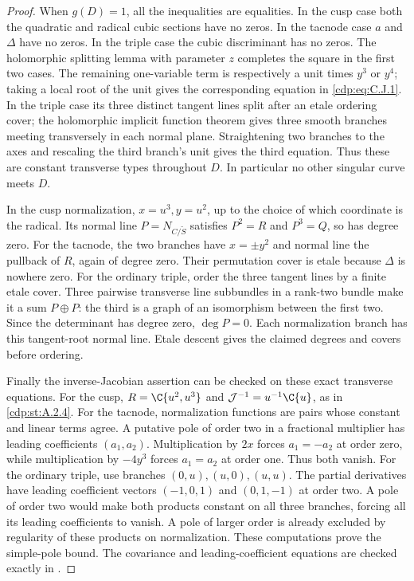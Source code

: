 \begin{proof}
When $g(D)=1$, all the inequalities are equalities. In the cusp case both the quadratic and radical cubic sections have no zeros. In the tacnode case $a$ and $\Delta$ have no zeros. In the triple case the cubic discriminant has no zeros. The holomorphic splitting lemma with parameter $z$ completes the square in the first two cases. The remaining one-variable term is respectively a unit times $y^3$ or $y^4$; taking a local root of the unit gives the corresponding equation in \eqref{cdp:eq:C.J.1}. In the triple case its three distinct tangent lines split after an etale ordering cover; the holomorphic implicit function theorem gives three smooth branches meeting transversely in each normal plane. Straightening two branches to the axes and rescaling the third branch's unit gives the third equation. Thus these are constant transverse types throughout $D$. In particular no other singular curve meets $D$.

In the cusp normalization, $x=u^3,y=u^2$, up to the choice of which coordinate is the radical. Its normal line $P=N_{C/\widetilde S}$ satisfies $P^2=R$ and $P^3=Q$, so has degree zero. For the tacnode, the two branches have $x=\pm y^2$ and normal line the pullback of $R$, again of degree zero. Their permutation cover is etale because $\Delta$ is nowhere zero. For the ordinary triple, order the three tangent lines by a finite etale cover. Three pairwise transverse line subbundles in a rank-two bundle make it a sum $P\oplus P$: the third is a graph of an isomorphism between the first two. Since the determinant has degree zero, $\deg P=0$. Each normalization branch has this tangent-root normal line. Etale descent gives the claimed degrees and covers before ordering.

Finally the inverse-Jacobian assertion can be checked on these exact transverse equations. For the cusp, $R=\C\{u^2,u^3\}$ and $\mathcal J^{-1}=u^{-1}\C\{u\}$, as in \ref{cdp:st:A.2.4}. For the tacnode, normalization functions are pairs whose constant and linear terms agree. A putative pole of order two in a fractional multiplier has leading coefficients $(a_1,a_2)$. Multiplication by $2x$ forces $a_1=-a_2$ at order zero, while multiplication by $-4y^3$ forces $a_1=a_2$ at order one. Thus both vanish. For the ordinary triple, use branches $(0,u),(u,0),(u,u)$. The partial derivatives have leading coefficient vectors $(-1,0,1)$ and $(0,1,-1)$ at order two. A pole of order two would make both products constant on all three branches, forcing all its leading coefficients to vanish. A pole of larger order is already excluded by regularity of these products on normalization. These computations prove the simple-pole bound. The covariance and leading-coefficient equations are checked exactly in .
\end{proof}


